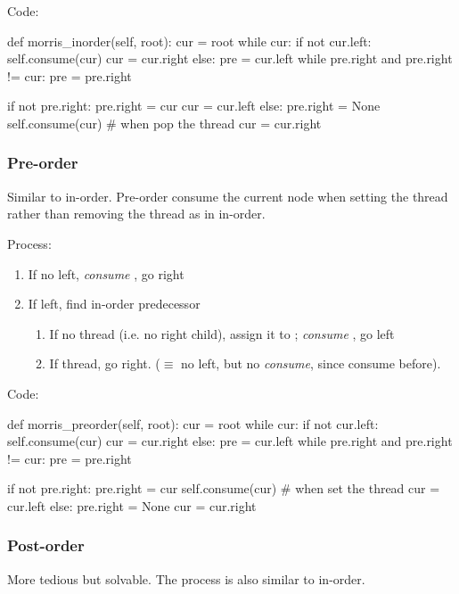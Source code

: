Code:
\begin{python}
def morris_inorder(self, root):
    cur = root
    while cur:
        if not cur.left:
            self.consume(cur)
            cur = cur.right
        else:  
            pre = cur.left
            while pre.right and pre.right != cur:
                pre = pre.right

            if not pre.right:
                pre.right = cur
                cur = cur.left
            else:
                pre.right = None
                self.consume(cur)  # when pop the thread
                cur = cur.right
\end{python}
\subsubsection{Pre-order}
Similar to in-order. Pre-order consume the current node when setting the thread rather than removing the thread as in in-order.

Process:
\begin{enumerate}
\item If no left, \textit{consume} , go right 
\item If left, find in-order predecessor 
\begin{enumerate}
\item If no thread (i.e. no  right child), assign it to ; \textit{consume} , go left
\item If thread, go right. ($\equiv$ no left, but no \textit{consume}, since consume before). 
\end{enumerate}
\end{enumerate}
Code:
\begin{python}
def morris_preorder(self, root):
    cur = root
    while cur:
        if not cur.left:
            self.consume(cur)
            cur = cur.right
        else:
            pre = cur.left
            while pre.right and pre.right != cur:
                pre = pre.right

            if not pre.right:
                pre.right = cur
                self.consume(cur)  # when set the thread
                cur = cur.left
            else:
                pre.right = None
                cur = cur.right
\end{python}
\subsubsection{Post-order}
More tedious but solvable. The process is also similar to in-order.

